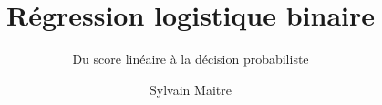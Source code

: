 \documentclass[11pt,aspectratio=169]{beamer}
\title{Régression logistique binaire}
\subtitle{Du score linéaire à la décision probabiliste}
\author{Sylvain Maitre}
\date{}
\newcounter{coursechapter}
\newcommand{\coursechapterindicator}{}
\newcommand{\coursepartshort}{Vue d'ensemble}
\newcommand{\coursepartposition}{Vue d'ensemble}
\newcommand{\coursepartindex}{0}
\newcommand{\coursepartcolor}{courseproblem}
\newif\ifcoursenavigationvisible
\newcommand{\coursefinishstage}{}
\newcommand{\courseintro}{%
  \coursefinishstage
  \coursenavigationvisiblefalse
  \gdef\coursechapterindicator{}%
  \gdef\coursepartshort{Introduction}%
  \gdef\coursepartposition{Introduction}%
  \gdef\coursepartindex{0}%
  \gdef\coursepartcolor{courseproblem}}
\begin{document}
\begin{frame}[plain]
  \titlepage
\end{frame}



\courseintro
\end{document}
